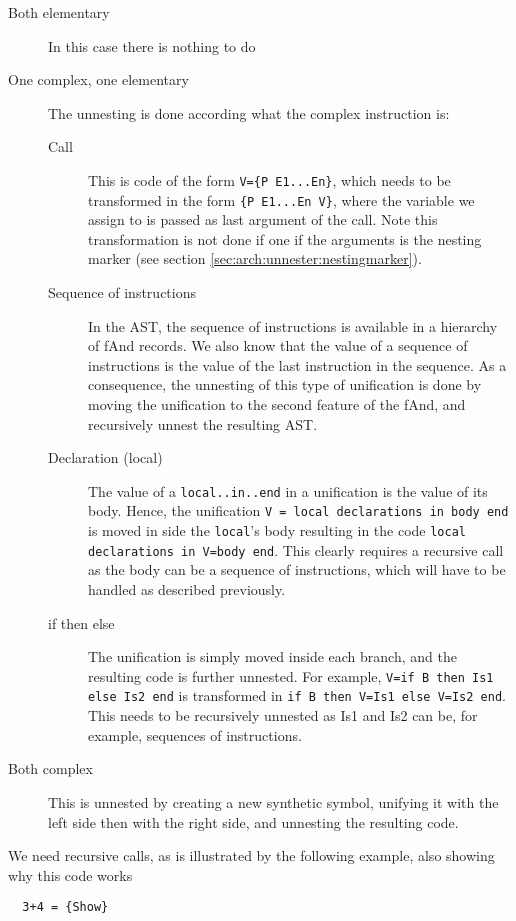 \documentclass[a4paper]{memoir}
\begin{document}
\begin{description}
  \item[Both elementary]In this case there is nothing to do
  \item[One complex, one elementary] The unnesting is done according what the complex instruction is: 
    \begin{description}
      \item[Call] This is code of the form \lstinline!V={P E1...En}!, which needs to be transformed in the form \lstinline!{P E1...En V}!, where the variable we assign to is passed as last argument of the call. Note this transformation is not done if one if the arguments is the nesting marker (see section \ref{sec:arch:unnester:nestingmarker}).
      \item[Sequence of instructions] In the AST, the sequence of instructions is available in a hierarchy of fAnd records. We also know that the value of a sequence of instructions is the value of the last instruction in the sequence. As a consequence, the unnesting of this type of unification is done by moving the unification to the second feature of the fAnd, and recursively unnest the resulting AST.
      \item[Declaration (local)] The value of a \lstinline!local..in..end! in a
        unification is the value of its body. Hence, the unification
        \lstinline!V = local declarations in body end! is moved in side the
        \lstinline!local!'s body resulting in the code \lstinline!local declarations in V=body end!. This clearly requires a recursive call as the body can be a sequence of instructions, which will have to be handled as described previously.
      \item[if then else] The unification is simply moved inside each branch, and the resulting code is further unnested. For example, \lstinline!V=if B then Is1 else Is2 end! is transformed in \lstinline!if B then V=Is1 else V=Is2 end!. This needs to be recursively unnested as Is1 and Is2 can be, for example,  sequences of instructions.
    \end{description}
  \item[Both complex] This is unnested by creating a new synthetic symbol, unifying it with the left side then with the right side, and unnesting the resulting code.
\end{description}
We need recursive calls, as is illustrated by the following example, also showing why this code works
\begin{lstlisting}
  3+4 = {Show}
\end{lstlisting}
\end{document}
